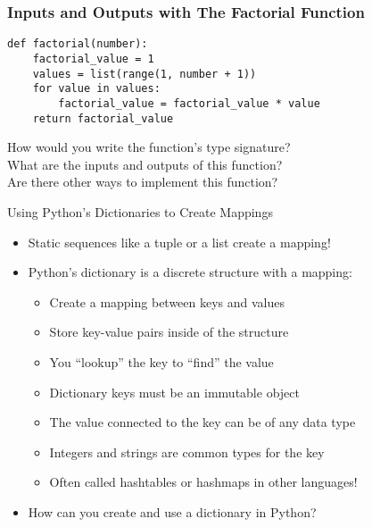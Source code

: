 \documentclass[14pt,aspectratio=169]{beamer}
\begin{document}
%
\begin{frame}[fragile]
  \frametitle{Inputs and Outputs with The Factorial Function}
  \hspace*{-.2in}
  \begin{minipage}{6in}
    \vspace*{.2in}
    \begin{verbatim}
def factorial(number):
    factorial_value = 1
    values = list(range(1, number + 1))
    for value in values:
        factorial_value = factorial_value * value
    return factorial_value
    \end{verbatim}
  \end{minipage}
  \vspace*{.025in}
  \begin{center}
    \normalsize \noindent How would you write the function's type signature? \\
    \normalsize \noindent What are the inputs and outputs of this function? \\
    \normalsize \noindent Are there other ways to implement this function? \\
  \end{center}
\end{frame}

%
\begin{frame}{Using Python's Dictionaries to Create Mappings}
  \begin{itemize}
    \item Static sequences like a tuple or a list create a mapping!
      \vspace*{-.15in}
    \item Python's dictionary is a discrete structure with a mapping:
      \begin{itemize}
        \item Create a mapping between keys and values
        \item Store key-value pairs inside of the structure
        \item You ``lookup'' the key to ``find'' the value
        \item Dictionary keys must be an immutable object
        \item The value connected to the key can be of any data type
        \item Integers and strings are common types for the key
        \item Often called hashtables or hashmaps in other languages!
      \end{itemize}
      \vspace*{-.2in}
    \item How can you create and use a dictionary in Python?
  \end{itemize}
\end{frame}
\end{document}
